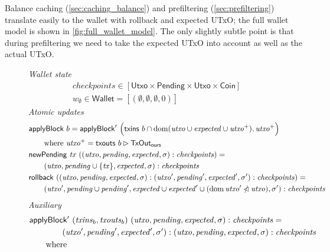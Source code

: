 \documentclass{article}
\newcommand{\restrictdom}{\lhd}
\newcommand{\subtractdom}{\mathbin{\slashed{\restrictdom}}}
\newcommand{\restrictrange}{\rhd}
\DeclareMathOperator{\dom}{dom}
\theoremstyle{definition}{
  \newtheorem{lemma}{Lemma}[section] %
  \newtheorem{definition}[lemma]{Definition}
}
\theoremstyle{theorem}{
  \newtheorem{invariant}[lemma]{Invariant}
  \newtheorem{proofobligation}[lemma]{Proof Obligation}
}
\numberwithin{equation}{lemma}
\begin{document}
Balance caching (\cref{sec:caching_balance}) and prefiltering
(\cref{sec:prefiltering}) translate easily to the wallet with
rollback and expected UTxO; the full wallet model is shown in
\cref{fig:full_wallet_model}. The only slightly subtle point is
that during prefiltering we need to take the expected UTxO into account as
well as the actual UTxO.

\begin{figure}
%
\emph{Wallet state}
%
\begin{align*}
& \mathit{checkpoints} \in [\mathsf{Utxo} \times \mathsf{Pending} \times \mathsf{Utxo} \times \mathsf{Coin}] \\
& w_\emptyset \in \mathsf{Wallet} = [(\emptyset, \emptyset, \emptyset, 0)]
\end{align*}
%
\emph{Atomic updates}
%
\begin{align*}
& \mathsf{applyBlock} ~ b
  = \mathsf{applyBlock}' ~ \Big( \mathsf{txins} ~ b \cap \dom (\mathit{utxo} \cup \mathit{expected} \cup \mathit{utxo}^+), \mathit{utxo}^+ \Bigr) \\
& \qquad \text{where~} \mathit{utxo}^+ = \mathsf{txouts} ~ b \restrictrange \mathsf{TxOut_{ours}} \\
& \mathsf{newPending} ~ \mathit{tx} ~ ((\mathit{utxo}, \mathit{pending}, \mathit{expected}, \sigma) : \mathit{checkpoints}) = \\
& \qquad (\mathit{utxo}, \mathit{pending} \cup \{\mathit{tx}\}, \mathit{expected}, \sigma) : \mathit{checkpoints} \\
& \mathsf{rollback} ~ ((\mathit{utxo}, \mathit{pending}, \mathit{expected}, \sigma) : (\mathit{utxo}', \mathit{pending}', \mathit{expected}', \sigma') : \mathit{checkpoints}) = \\
& \qquad (\mathit{utxo}', \mathit{pending} \cup \mathit{pending}', \mathit{expected} \cup \mathit{expected}' \cup (\dom \mathit{utxo}' \subtractdom \mathit{utxo}), \sigma') : \mathit{checkpoints} \\
\end{align*}
%
\emph{Auxiliary}
%
\begin{align*}
& \mathsf{applyBlock'} ~ (\mathit{txins}_b, \mathit{txouts}_b) ~ (\mathit{utxo}, \mathit{pending}, \mathit{expected}, \sigma) : \mathit{checkpoints} = \\
& \qquad\qquad (\mathit{utxo}', \mathit{pending}', \mathit{expected}', \sigma') : (\mathit{utxo}, \mathit{pending}, \mathit{expected}, \sigma) : \mathit{checkpoints} \\
& \qquad \text{where}
   \begin{array}[t]{rl}

\end{array}
\end{align*}
\end{figure}
\end{document}
